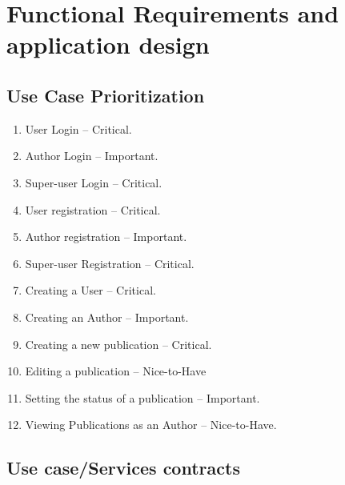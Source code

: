 \documentclass[hidelinks,a4paper,12pt]{article}
\begin{document}
	\section{Functional Requirements and application design}
	\subsection{ Use Case Prioritization}
	
	
	\begin{enumerate}
		
		\item  User Login -- Critical.
		
		\item  Author Login -- Important.
		
		\item  Super-user Login -- Critical.
		
		\item  User registration -- Critical.
		
		\item  Author registration -- Important.
		
		\item  Super-user Registration -- Critical.
		
		\item  Creating a User -- Critical.
		
		\item  Creating an Author -- Important.
		
		\item  Creating a new publication -- Critical.
		
		\item  Editing a publication -- Nice-to-Have
		
		\item  Setting the status of a publication -- Important.
		
		\item  Viewing Publications as an Author -- Nice-to-Have.
	\end{enumerate}
	
	\noindent 
	
	
	\subsection{ Use case/Services contracts}
	
\end{document}
